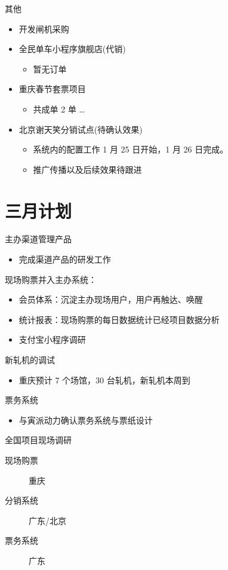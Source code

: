\documentclass[presentation, bigger]{beamer}
\begin{document}
\begin{frame}[label={sec:org82cc8d4}]{其他}
\begin{itemize}
\item 开发闸机采购
\item 全民单车小程序旗舰店(代销)
\begin{itemize}
\item 暂无订单
\end{itemize}
\item 重庆春节套票项目
\begin{itemize}
\item 共成单 2 单 \ldots{}
\end{itemize}
\item 北京谢天笑分销试点(待确认效果)
\begin{itemize}
\item 系统内的配置工作 1 月 25 日开始，1 月 26 日完成。
\item 推广传播以及后续效果待跟进
\end{itemize}
\end{itemize}
\end{frame}

\section{三月计划}
\label{sec:org9f34445}

\begin{frame}[label={sec:org68a1601}]{主办渠道管理产品}
\begin{itemize}
\item 完成渠道产品的研发工作
\end{itemize}
\end{frame}

\begin{frame}[label={sec:orgeb64bd1}]{现场购票并入主办系统：}
\begin{itemize}
\item 会员体系：沉淀主办现场用户，用户再触达、唤醒
\item 统计报表：现场购票的每日数据统计已经项目数据分析
\item 支付宝小程序调研
\end{itemize}
\end{frame}

\begin{frame}[label={sec:org053fe6c}]{新轧机的调试}
\begin{itemize}
\item 重庆预计 7 个场馆，30 台轧机，新轧机本周到
\end{itemize}
\end{frame}

\begin{frame}[label={sec:org40530be}]{票务系统}
\begin{itemize}
\item 与寅派动力确认票务系统与票纸设计
\end{itemize}
\end{frame}

\begin{frame}[label={sec:org8dbf69c}]{全国项目现场调研}
\begin{description}
\item[{现场购票}] 重庆
\item[{分销系统}] 广东/北京
\item[{票务系统}] 广东
\end{description}
\end{frame}
\end{document}
